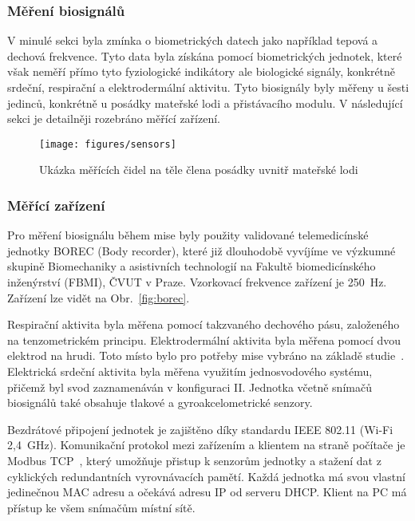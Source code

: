 \subsubsection{Měření biosignálů}
\label{subsubsec:mereni_biosignalu}
V minulé sekci byla zmínka o biometrických datech jako například tepová a
dechová frekvence. Tyto data byla získána pomocí biometrických jednotek, které
však neměří přímo tyto fyziologické indikátory ale biologické signály, konkrétně
srdeční, respirační a elektrodermální aktivitu. Tyto biosignály byly měřeny u
šesti jedinců, konkrétně u posádky mateřské lodi a přistávacího modulu. V
následující sekci je detailněji rozebráno měřící zařízení.

\begin{figure}[h]
    \begin{center}
        \texttt{[image: figures/sensors]}
        \caption{Ukázka měřících čidel na těle člena posádky uvnitř mateřské lodi}
        \label{fig:sensors}
    \end{center}
\end{figure}

\subsubsection{Měřící zařízení}
\label{subsubsec:merici_zarizeni}
Pro měření biosignálu během mise byly použity validované telemedicínské jednotky
BOREC (Body recorder), které již dlouhodobě vyvíjíme ve výzkumné skupině
Biomechaniky a asistivních technologií na Fakultě biomedicínského inženýrství
(\gls{FBMI}), ČVUT v Praze. Vzorkovací frekvence zařízení je 250~Hz. Zařízení
lze vidět na Obr.~\ref{fig:borec}.

Respirační aktivita byla měřena pomocí takzvaného dechového pásu, založeného na
tenzometrickém principu. Elektrodermální aktivita byla měřena pomocí dvou
elektrod na hrudi. Toto místo bylo pro potřeby mise vybráno na základě
studie~\cite{Janssen2012}. Elektrická srdeční aktivita byla měřena využitím
jednosvodového systému, přičemž byl svod zaznamenáván v konfiguraci II. Jednotka
včetně snímačů biosignálů také obsahuje tlakové a gyroakcelometrické senzory.

Bezdrátové připojení jednotek je zajištěno díky standardu IEEE 802.11 (Wi-Fi
2,4~GHz). Komunikační protokol mezi zařízením a klientem na straně počítače je
Modbus TCP~\cite{modbus}, který umožňuje přistup k senzorům jednotky a stažení
dat z cyklických redundantních vyrovnávacích pamětí. Každá jednotka má svou
vlastní jedinečnou MAC adresu a očekává adresu IP od serveru DHCP. Klient na PC
má přístup ke všem snímačům místní sítě.

